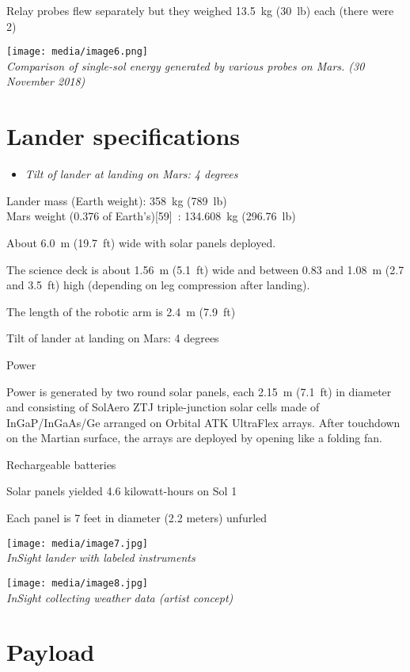 Relay probes flew separately but they weighed 13.5~kg (30~lb) each
(there were 2)

\texttt{[image: media/image6.png]}\\
\emph{Comparison of single-sol energy generated by various probes on
Mars. (30 November 2018)}

\section{Lander specifications}\label{lander-specifications}

\begin{itemize}
\item
  \emph{Tilt of lander at landing on Mars: 4 degrees}
\end{itemize}

Lander mass (Earth weight): 358~kg (789~lb)\\
Mars weight (0.376 of Earth's){[}59{]}~: 134.608~kg (296.76~lb)

About 6.0~m (19.7~ft) wide with solar panels deployed.

The science deck is about 1.56~m (5.1~ft) wide and between 0.83 and
1.08~m (2.7 and 3.5~ft) high (depending on leg compression after
landing).

The length of the robotic arm is 2.4~m (7.9~ft)

Tilt of lander at landing on Mars: 4 degrees

Power

Power is generated by two round solar panels, each 2.15~m (7.1~ft) in
diameter and consisting of SolAero ZTJ triple-junction solar cells made
of InGaP/InGaAs/Ge arranged on Orbital ATK UltraFlex arrays. After
touchdown on the Martian surface, the arrays are deployed by opening
like a folding fan.

Rechargeable batteries

Solar panels yielded 4.6 kilowatt-hours on Sol 1

Each panel is 7 feet in diameter (2.2 meters) unfurled

\texttt{[image: media/image7.jpg]}\\
\emph{InSight lander with labeled instruments}

\texttt{[image: media/image8.jpg]}\\
\emph{InSight collecting weather data (artist concept)}

\section{Payload}\label{payload}

